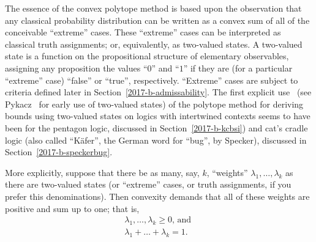 The essence of the convex polytope method is based upon the observation that
any classical probability distribution can be written as a convex sum of all of the conceivable ``extreme'' cases.
These ``extreme'' cases can be interpreted as classical truth assignments; or, equivalently,
as two-valued states. A two-valued state is a function on the propositional structure of elementary observables,
assigning any proposition the values ``$0$'' and ``$1$'' if they are (for a particular ``extreme'' case)
``false'' or ``true'', respectively.
``Extreme'' cases are subject to criteria defined later in Section~\ref{2017-b-admissability}.
The first explicit use~\cite{svozil-2001-cesena,svozil-2001-eua,svozil-2008-ql,svozil-2016-s}
(see Pykacz~\cite{Pykacz1989} for early use of two-valued states)
of the polytope method for deriving bounds using two-valued states on logics with intertwined contexts
seems to have been for the pentagon logic, discussed in Section~\ref{2017-b-kcbsi}) and cat's cradle logic
(also called ``K\"afer'', the German word for ``bug'', by Specker), discussed in Section~\ref{2017-b-speckerbug}.


More explicitly, suppose that there be as many, say, $k$, ``weights'' $\lambda_1, \ldots ,\lambda_k$ as there are two-valued states
(or ``extreme'' cases, or truth assignments, if you prefer this denominations).
Then convexity demands that all of these weights are positive and sum up to one; that is,
\begin{equation}
\begin{split}
\lambda_1, \ldots , \lambda_k  \ge 0
\text{, and }
\\
\lambda_1 + \ldots + \lambda_k   = 1
.
\label{2017-b-convexity}
\end{split}
\end{equation}


